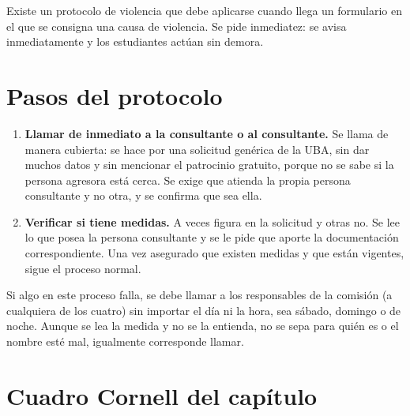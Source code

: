 \documentclass[12pt,oneside]{book}
\begin{document}
Existe un protocolo de violencia que debe aplicarse cuando llega un formulario en el que se consigna una causa de violencia. Se pide inmediatez: se avisa inmediatamente y los estudiantes actúan sin demora.

\section{Pasos del protocolo}

\begin{enumerate}
    \item \textbf{Llamar de inmediato a la consultante o al consultante.} Se llama de manera cubierta: se hace por una solicitud genérica de la UBA, sin dar muchos datos y sin mencionar el patrocinio gratuito, porque no se sabe si la persona agresora está cerca. Se exige que atienda la propia persona consultante y no otra, y se confirma que sea ella.
    \item \textbf{Verificar si tiene medidas.} A veces figura en la solicitud y otras no. Se lee lo que posea la persona consultante y se le pide que aporte la documentación correspondiente. Una vez asegurado que existen medidas y que están vigentes, sigue el proceso normal.
\end{enumerate}


\begin{important}
Si algo en este proceso falla, se debe llamar a los responsables de la comisión (a cualquiera de los cuatro) sin importar el día ni la hora, sea sábado, domingo o de noche. Aunque se lea la medida y no se la entienda, no se sepa para quién es o el nombre esté mal, igualmente corresponde llamar.
\end{important}

\section{Cuadro Cornell del capítulo}
\end{document}
